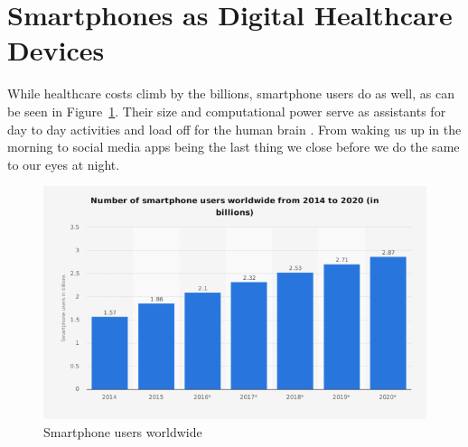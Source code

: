 \section{Smartphones as Digital Healthcare Devices}
While healthcare costs climb by the billions, smartphone users do as well, as can be seen in Figure~\ref{fig:graphical_statistics_of_smartphone_users}. Their size and computational power serve as assistants for day to day activities and load off for the human brain \cite{barr2015brain}. From waking us up in the morning to social media apps being the last thing we close before we do the same to our eyes at night.
\begin{figure}[htpb]
    \centering
    \includegraphics[width=0.8\linewidth]{media/Graphical-statistics-of-smartphone-users.png}
    \caption{Smartphone users worldwide \cite{numSmartphones}}%
    \label{fig:graphical_statistics_of_smartphone_users}
\end{figure}
\label{sec:smartphoneChances}
